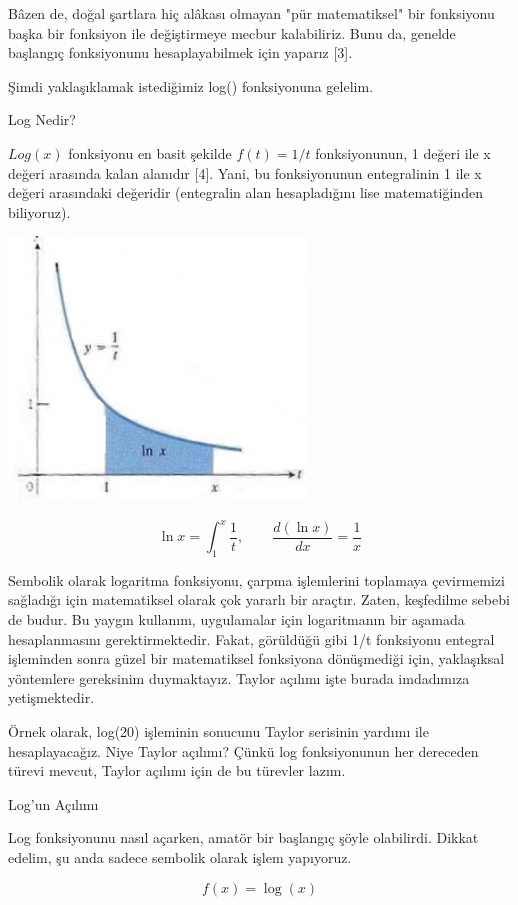 \documentclass[12pt,fleqn]{article}\usepackage{../../common}
\begin{document}
Bâzen de, doğal şartlara hiç alâkası olmayan "pür matematiksel" bir
fonksiyonu başka bir fonksiyon ile değiştirmeye mecbur kalabiliriz. Bunu
da, genelde başlangıç fonksiyonunu hesaplayabilmek için yaparız [3].

Şimdi yaklaşıklamak istediğimiz log() fonksiyonuna gelelim.

Log Nedir?

$Log(x)$ fonksiyonu en basit şekilde $f(t)=1/t$ fonksiyonunun, 1 değeri ile x
değeri arasında kalan alanıdır [4]. Yani, bu fonksiyonunun entegralinin 1 ile
x değeri arasındaki değeridir (entegralin alan hesapladığını lise
matematiğinden biliyoruz).

\includegraphics[height=7cm]{taylor_log_graph.jpg}

$$ \ln x = \int _{1}^{x} \frac{1}{t}, \qquad \frac{d(\ln x)}{dx} = \frac{1}{x}$$

Sembolik olarak logaritma fonksiyonu, çarpma işlemlerini toplamaya
çevirmemizi sağladığı için matematiksel olarak çok yararlı bir
araçtır. Zaten, keşfedilme sebebi de budur. Bu yaygın kullanım, uygulamalar
için logaritmanın bir aşamada hesaplanmasını gerektirmektedir. Fakat,
görüldüğü gibi 1/t fonksiyonu entegral işleminden sonra güzel bir
matematiksel fonksiyona dönüşmediği için, yaklaşıksal yöntemlere gereksinim
duymaktayız. Taylor açılımı işte burada imdadımıza yetişmektedir.

Örnek olarak, log(20) işleminin sonucunu Taylor serisinin yardımı ile
hesaplayacağız. Niye Taylor açılımı? Çünkü log fonksiyonunun her dereceden
türevi mevcut, Taylor açılımı için de bu türevler lazım.

Log'un Açılımı

Log fonksiyonunu nasıl açarken, amatör bir başlangıç şöyle
olabilirdi. Dikkat edelim, şu anda sadece sembolik olarak işlem yapıyoruz.

$$ f(x) = \log(x) $$
\end{document}
